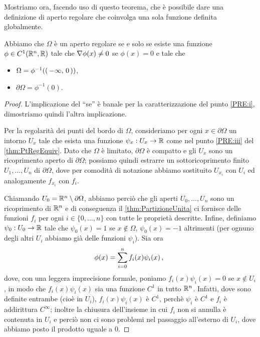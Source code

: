 Mostriamo ora, facendo uso di questo teorema, che è possibile dare una definizione di aperto regolare che coinvolga una sola funzione definita globalmente.

\begin{lemma}\label{lemma:EquivRegolare}
	Abbiamo che $\Omega$ è un aperto regolare se e solo se esiste una funzione $\phi\in C^1(\mathbb R^n,\mathbb R)$ tale che $\nabla \phi(x)\neq 0$ se $\phi(x)=0$ e tale che
	\begin{itemize}
		\item $\Omega = \phi^{-1}(\left(\,-\infty,\,0\,\right))$,
		\item $\partial \Omega = \phi^{-1}(0)$.
	\end{itemize}
\end{lemma}

\begin{proof}
	L'implicazione del ``se'' è banale per la caratterizzazione del punto \ref{PRE:i}, dimostriamo quindi l'altra implicazione. 
	
	Per la regolarità dei punti
	del bordo di $\Omega$, consideriamo per ogni $x\in\partial \Omega$ un intorno $U_x$ tale che esista una funzione $\psi_x:U_x\rightarrow \mathbb R$
	come nel punto \ref{PRE:iii} del \cref{thm:PtRegEquiv}. Dato che $\Omega$ è limitato, $\partial\Omega$ è compatto e gli $U_x$ sono un ricoprimento aperto di $\partial \Omega$; possiamo
	quindi estrarre un sottoricoprimento finito $U_1, \dots, U_n$ di $\partial\Omega$, dove per comodità di notazione abbiamo sostituito $U_{x_i}$ con $U_i$ ed analogamente $f_{x_i}$ con $f_i$. 
	
	Chiamando $U_0 = \mathbb R^n \setminus \partial \Omega$,
	abbiamo perciò che gli aperti $U_0,\dots,U_n$ sono un ricoprimento di $\mathbb R^n$ e di conseguenza
	il \cref{thm:PartizioneUnita} ci fornisce delle funzioni $f_i$ per ogni $i\in\{0,\dots, n\}$ con tutte le proprietà descritte.
	Infine, definiamo $\psi_0:U_0\rightarrow \mathbb R$ tale che $\psi_0(x)=1$ se $x\notin \Omega$, $\psi_0(x)=-1$ altrimenti (per ognuno degli altri $U_i$ abbiamo già delle funzioni $\psi_i$). Sia ora 
	\[
		\phi(x)=\sum_{i=0}^n f_i(x) \psi_i(x)\, \text{, }
	\]
	dove, con una leggera imprecisione formale, poniamo $f_i(x) \psi_i(x) = 0$ se $x\notin U_i$, in modo che $f_i(x) \psi_i(x)$ sia una funzione
	$C^1$ in tutto $\mathbb R^n$. Infatti, dove sono definite entrambe (cioè in $U_i$), $f_i(x)\psi_i(x)$ è $C^1$, perchè $\psi_i$ è $C^1$ e $f_i$ è addirittura $C^{\infty}$; inoltre la chiusura dell'insieme in cui $f_i$ non si annulla è contenuta in $U_i$ e perciò non ci sono problemi nel passaggio all'esterno di $U_i$, dove abbiamo posto il prodotto uguale a 0.
	

\end{proof}
